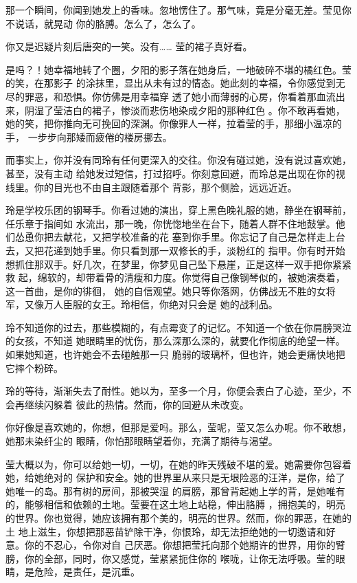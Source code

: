 \documentclass[12pt,a4paper]{article}
\begin{document}
		那一个瞬间，你闻到她发上的香味。忽地愣住了。那气味，竟是分毫无差。莹见你不说话，就晃动
	你的胳膊。怎么了，怎么了。

		你又是迟疑片刻后唐突的一笑。没有…… 莹的裙子真好看。

		是吗？！她幸福地转了个圈，夕阳的影子落在她身后，一地破碎不堪的橘红色。莹的笑，在那影子
	的涂抹里，显出从未有过的情态。她此刻的幸福，令你感觉到无尽的罪恶，和恐惧。你仿佛是用幸福穿
	透了她小而薄弱的心房，你看着那血流出来，阴湿了莹洁白的裙子，惨淡而悲伤地染成夕阳的那种红色
	。你不敢再看她，她的笑，把你推向无可挽回的深渊。你像罪人一样，拉着莹的手，那细小温凉的手，
	一步步向那矮而疲倦的楼房挪去。


		而事实上，你并没有同玲有任何更深入的交往。你没有碰过她，没有说过喜欢她，甚至，没有主动
	给她发过短信，打过招呼。你刻意回避，而玲总是出现在你的视线里。你的目光也不由自主跟随着那个
	背影，那个侧脸，远远近近。

		玲是学校乐团的钢琴手。你看过她的演出，穿上黑色晚礼服的她，静坐在钢琴前，任乐章于指间如
	水流出，那一晚，你恍惚地坐在台下，随着人群不住地鼓掌。他们怂恿你把去献花，又把学校准备的花
	塞到你手里。你忘记了自己是怎样走上台去，又把花递到她手里。你只看到那一双修长的手，淡粉红的
	指甲。你有时开始想抓住那双手。好几次，在梦里，你梦见自己坠下悬崖，正是这样一双手把你紧紧救
	起，绵软的，却带着骨的清瘦和力度。你觉得自己像钢琴似的，被她演奏着，这一首曲，是你的徘徊，
	她的自信观望。她只等你落网，仿佛战无不胜的女将军，又像万人臣服的女王。玲相信，你绝对只会是
	她的战利品。


		玲不知道你的过去，那些模糊的，有点霉变了的记忆。不知道一个依在你肩膀哭泣的女孩，不知道
	她眼睛里的忧伤，那么深那么深的，就要化作彻底的绝望一样。如果她知道，也许她会不去碰触那一只
	脆弱的玻璃杯，但也许，她会更痛快地把它摔个粉碎。

		玲的等待，渐渐失去了耐性。她以为，至多一个月，你便会表白了心迹，至少，不会再继续闪躲着
	彼此的热情。然而，你的回避从未改变。

		你好像是喜欢她的，你想，但那是爱吗。那么，莹呢，莹又怎么办呢。你不敢想，她那未染纤尘的
	眼睛，你怕那眼睛望着你，充满了期待与渴望。

		莹大概以为，你可以给她一切，一切，在她的昨天残破不堪的爱。她需要你包容着她，给她绝对的
	保护和安全。她的世界里从来只是无垠险恶的汪洋，是你，给了她唯一的岛。那有树的房间，那被哭湿
	的肩膀，那曾背起她上学的背，是她唯有的，能够相信和依赖的土地。莹要在这土地上站稳，伸出胳膊
	，拥抱美的，明亮的世界。你也觉得，她应该拥有那个美的，明亮的世界。然而，你的罪恶，在她的土
	地上滋生，你想把那恶苗铲除干净，你恨玲，却无法拒绝她的一切邀请和好意。你的不忍心，令你对自
	己厌恶。你想把莹托向那个她期许的世界，用你的臂膀，你的全部，同时，你又感觉，莹紧紧扼住你的
	喉咙，让你无法呼吸。莹的眼睛，是危险，是责任，是沉重。
\end{document}
